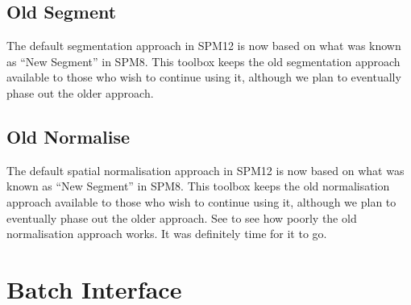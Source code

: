 \documentclass[a4paper,titlepage,openany]{article}
\begin{document}
\begin{multicols}{2}
\subsection{Old Segment}
The default segmentation approach in SPM12 is now based on what was known as ``New Segment'' in SPM8.
This toolbox keeps the old segmentation approach available to those who wish to continue using it, although we plan to eventually phase out the older approach.

\subsection{Old Normalise}
The default spatial normalisation approach in SPM12 is now based on what was known as ``New Segment'' in SPM8.
This toolbox keeps the old normalisation approach available to those who wish to continue using it, although we plan to eventually phase out the older approach.
See \cite{klein_evaluation} to see how poorly the old normalisation approach works.
It was definitely time for it to go.

\section{Batch Interface}




\end{multicols}
\end{document}
